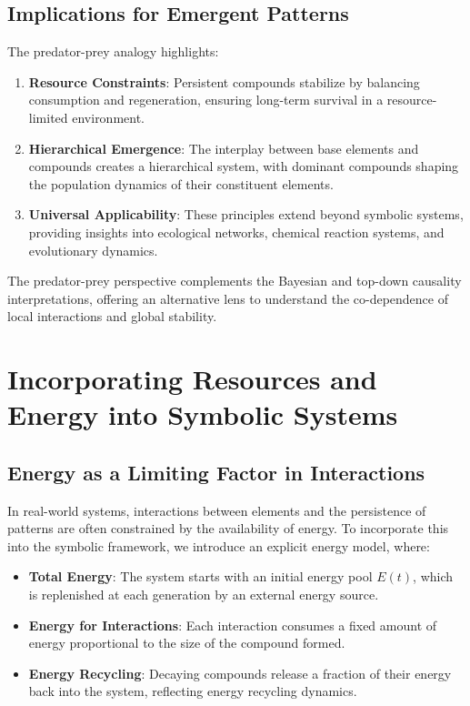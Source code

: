 \documentclass[entropy,article,submit,pdftex,moreauthors]{Definitions/mdpi}
\begin{document}
\subsection{Implications for Emergent Patterns}

The predator-prey analogy highlights:
\begin{enumerate}
    \item \textbf{Resource Constraints}: Persistent compounds stabilize by balancing consumption and regeneration, ensuring long-term survival in a resource-limited environment.
    \item \textbf{Hierarchical Emergence}: The interplay between base elements and compounds creates a hierarchical system, with dominant compounds shaping the population dynamics of their constituent elements.
    \item \textbf{Universal Applicability}: These principles extend beyond symbolic systems, providing insights into ecological networks, chemical reaction systems, and evolutionary dynamics.
\end{enumerate}

The predator-prey perspective complements the Bayesian and top-down causality interpretations, offering an alternative lens to understand the co-dependence of local interactions and global stability.

\section{Incorporating Resources and Energy into Symbolic Systems}

\subsection{Energy as a Limiting Factor in Interactions}

In real-world systems, interactions between elements and the persistence of patterns are often constrained by the availability of energy. To incorporate this into the symbolic framework, we introduce an explicit energy model, where:
\begin{itemize}
    \item \textbf{Total Energy}: The system starts with an initial energy pool \( E(t) \), which is replenished at each generation by an external energy source.
    \item \textbf{Energy for Interactions}: Each interaction consumes a fixed amount of energy proportional to the size of the compound formed.
    \item \textbf{Energy Recycling}: Decaying compounds release a fraction of their energy back into the system, reflecting energy recycling dynamics.
\end{itemize}
\end{document}
